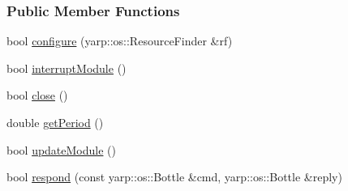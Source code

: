 \subsubsection*{Public Member Functions}
\begin{DoxyCompactItemize}
\item 
bool \hyperlink{group__ears_a359010b7ba800675dcbb4a7cce9e04c6}{configure} (yarp\+::os\+::\+Resource\+Finder \&rf)
\item 
bool \hyperlink{group__ears_a99e79a38ed88cd2cd42a43f061e5215c}{interrupt\+Module} ()
\item 
bool \hyperlink{group__ears_aec124e2e5bfbcfe1c21f943ec5f502a3}{close} ()
\item 
double \hyperlink{group__ears_aed464f8b1ee43113c03237cdffe66dc7}{get\+Period} ()
\item 
bool \hyperlink{group__ears_ae6ddc924bc901594ab56603aacb2b95f}{update\+Module} ()
\item 
bool \hyperlink{group__ears_a8c7824b28cc3b9ff6c5e367a386d8176}{respond} (const yarp\+::os\+::\+Bottle \&cmd, yarp\+::os\+::\+Bottle \&reply)
\end{DoxyCompactItemize}
